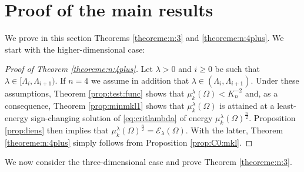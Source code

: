 \documentclass[10pt]{amsart}
\numberwithin{equation}{section}
\newcommand{\Om}{\Omega}
\newcommand{\mkl}{\mu_{k}^{\lambda}}
\theoremstyle{plain}
\theoremstyle{remark}
\begin{document}
\section{Proof of the main results} \label{sec:proof:main:results}

We prove in this section Theorems  \ref{theoreme:n:3} and \ref{theoreme:n:4plus}. We start with the higher-dimensional case:

\begin{proof}[Proof of Theorem \ref{theoreme:n:4plus}]
Let $\lambda >0$ and $i \ge 0$ be such that $\lambda \in [\Lambda_i, \Lambda_{i+1})$. If $n=4$ we assume in addition that $\lambda \in (\Lambda_i, \Lambda_{i+1})$. Under these assumptions, Theorem \ref{prop:test:func} shows that $\mkl(\Om) < K_n^{-2}$ and, as a consequence, Theorem \ref{prop:minmkl1} shows that $\mkl(\Om)$ is attained at a least-energy sign-changing solution of \eqref{eq:critlambda} of energy $\mkl(\Om)^{\frac{n}{2}}$. Proposition \ref{prop:liens}  then implies that  $\mkl(\Om)^{\frac{n}{2}} = \mathcal{E}_{\lambda}(\Om)$. With the latter, Theorem  \ref{theoreme:n:4plus} simply follows from Proposition \ref{prop:C0:mkl}. 
\end{proof}


We now consider the three-dimensional case and prove Theorem \ref{theoreme:n:3}.
\end{document}
